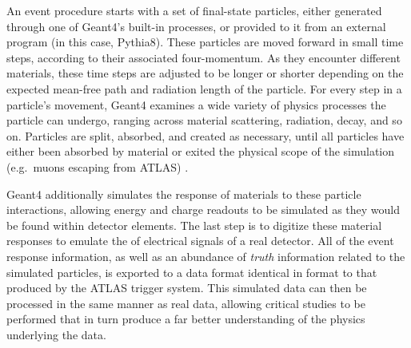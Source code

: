     An event procedure starts with a set of final-state particles,
        either generated through one of Geant4's built-in processes,
        or provided to it from an external program (in this case, Pythia8).
    These particles are moved forward in small time steps, according to their associated four-momentum.
    As they encounter different materials,
        these time steps are adjusted to be longer or shorter depending on
        the expected mean-free path and radiation length of the particle.
    For every step in a particle's movement,
        Geant4 examines a wide variety of physics processes the particle can undergo,
        ranging across material scattering, radiation, decay, and so on.
    Particles are split, absorbed, and created as necessary,
        until all particles have either been absorbed by material
        or exited the physical scope of the simulation (e.g.\ muons escaping from ATLAS) \cite{geant4}.

    Geant4 additionally simulates the response of materials to these particle interactions,
        allowing energy and charge readouts to be simulated as they would be found within detector elements.
    The last step is to digitize these material responses to emulate the of electrical signals of a real detector.
    All of the event response information, as well as an abundance of \textit{truth} information related to the simulated particles,
        is exported to a data format identical in format to that produced by the ATLAS trigger system.
    This simulated data can then be processed in the same manner as real data,
        allowing critical studies to be performed that in turn produce
        a far better understanding of the physics underlying the data.




